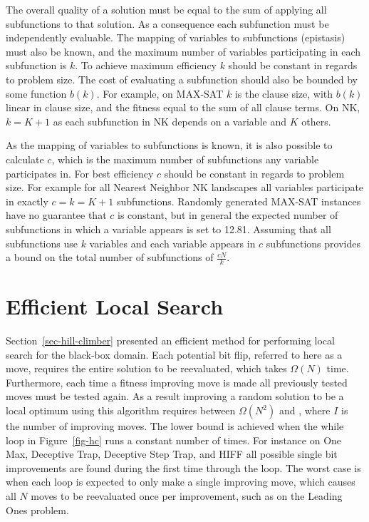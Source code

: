 The overall quality of a solution must be equal to the sum of applying all subfunctions to that
solution. As a consequence each subfunction must be independently evaluable.
The mapping of variables to subfunctions (epistasis) must also be known, and
the maximum number of variables participating in each subfunction is $k$.
To achieve maximum efficiency $k$ should be constant in regards to problem size. The cost
of evaluating a subfunction should also be bounded by some function $b(k)$. For example, on MAX-SAT
$k$ is the clause size, with $b(k)$ linear in clause size, and the fitness equal to the sum of
all clause terms. On NK, $k=K+1$ as each subfunction in NK depends on a variable and $K$ others.

As the mapping of variables to subfunctions is known, it is also possible to calculate $c$, which
is the maximum number of subfunctions any variable participates in. For best efficiency $c$ should
be constant in regards to problem size. For example for all Nearest Neighbor NK landscapes all variables
participate in exactly $c=k=K+1$ subfunctions. Randomly generated MAX-SAT instances have no guarantee
that $c$ is constant, but in general the expected number of subfunctions in which a variable appears is set to 12.81.
Assuming that all subfunctions use $k$ variables and each variable appears in $c$ subfunctions
provides a bound on the total number of subfunctions of $\frac{cN}{k}$.

\section{Efficient Local Search}
\label{sec-whitley-ls}
Section~\ref{sec-hill-climber} presented an efficient method for performing local search for the black-box
domain. Each potential bit flip, referred to here as a move, requires the entire solution to be reevaluated, which takes $\Omega(N)$ time.
Furthermore, each time a fitness improving move is made all previously tested moves must be tested again. As a result
improving a random solution to be a local optimum using this algorithm requires between $\Omega(N^2)$ and , where $I$ is the number
of improving moves. The lower bound is achieved when the while loop in Figure~\ref{fig-hc} runs a constant number of times.
For instance on One Max, Deceptive Trap, Deceptive Step Trap, and HIFF all possible single bit improvements are found during
the first time through the loop. The worst case is when each loop is expected to only make a single improving move, which causes
all $N$ moves to be reevaluated once per improvement, such as on the Leading Ones problem.

